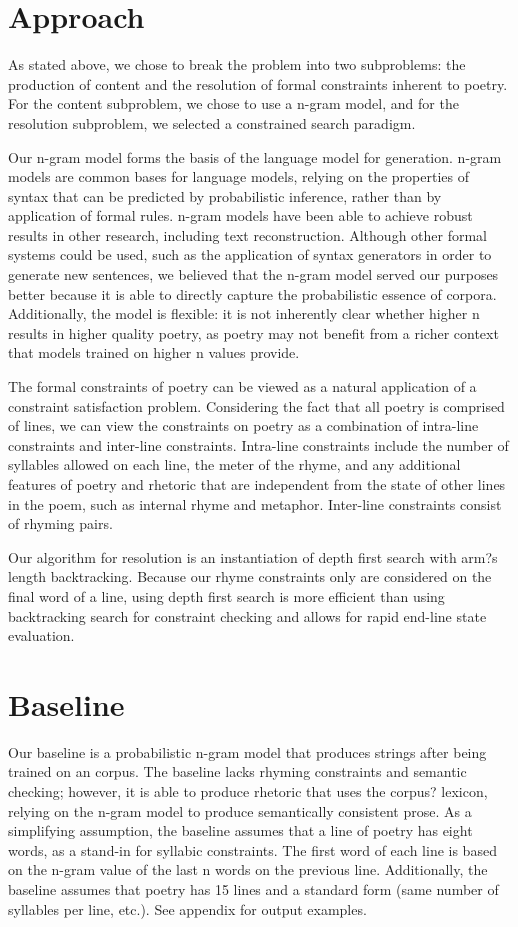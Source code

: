 \documentclass[10pt,twocolumn]{article}
\begin{document}
\section{Approach}
As stated above, we chose to break the problem into two subproblems: the production of content and the resolution of formal constraints inherent to poetry. For the content subproblem, we chose to use a n-gram model, and for the resolution subproblem, we selected a constrained search paradigm. 

Our n-gram model forms the basis of the language model for generation. n-gram models are common bases for language models, relying on the properties of syntax that can be predicted by probabilistic inference, rather than by application of formal rules. n-gram models have been able to achieve robust results in other research, including text reconstruction. Although other formal systems could be used, such as the application of syntax generators in order to generate new sentences, we believed that the n-gram model served our purposes better because it is able to directly capture the probabilistic essence of corpora. Additionally, the model is flexible: it is not inherently clear whether higher n results in higher quality poetry, as poetry may not benefit from a richer context that models trained on higher n values provide. 

The formal constraints of poetry can be viewed as a natural application of a constraint satisfaction problem. Considering the fact that all poetry is comprised of lines, we can view the constraints on poetry as a combination of intra-line constraints and inter-line constraints. Intra-line constraints include the number of syllables allowed on each line, the meter of the rhyme, and any additional features of poetry and rhetoric that are independent from the state of other lines in the poem, such as internal rhyme and metaphor. Inter-line constraints consist of rhyming pairs.

Our algorithm for resolution is an instantiation of depth first search with arm?s length backtracking. Because our rhyme constraints only are considered on the final word of a line, using depth first search is more efficient than using backtracking search for constraint checking and allows for rapid end-line state evaluation.

\section{Baseline}
Our baseline is a probabilistic n-gram model that produces strings after being trained on an corpus. The baseline lacks rhyming constraints and semantic checking; however, it is able to produce rhetoric that uses the corpus? lexicon, relying on the n-gram model to produce semantically consistent prose. As a simplifying assumption, the baseline assumes that a line of poetry has eight words, as a stand-in for syllabic constraints. The first word of each line is based on the n-gram value of the last n words on the previous line. Additionally, the baseline assumes that poetry has 15 lines and a standard form (same number of syllables per line, etc.). See appendix for output examples.
\end{document}

